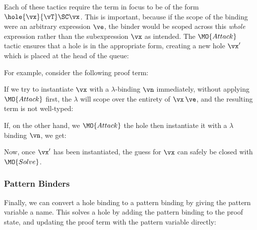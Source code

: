 Each of these tactics require the term in focus to be of the form $\hole{\vx}{\vT}\SC\vx$.
This is important, because if the scope of the binding were an arbitrary expression $\ve$,
the binder would be scoped across this \emph{whole} expression rather than the subexpression
$\vx$ as intended.
The $\MO{Attack}$ tactic ensures that a hole
is in the appropriate form, creating a new hole $\vx'$ which is placed at the
head of the queue:


\noindent
For example, consider the following proof term:

\DM{
\hole{\vx}{\va\to\vb}\SC\vx\:\ve
}

\noindent
If we try to instantiate $\vx$ with a $\lambda$-binding $\vn$ immediately,
without applying $\MO{Attack}$ first, the $\lambda$ will scope over the
entirety of $\vx\:\ve$, and the resulting term is not well-typed:

\DM{
\AR{
\lam{\vn}{\va}\SC\hole{\vx}{\vb}\SC\vx\:\ve
}
}

\noindent
If, on the other hand, we $\MO{Attack}$ the hole then instantiate it with
a $\lambda$ binding $\vn$, we get:


\noindent
Now, once $\vx'$ has been instantiated, the guess for $\vx$ can safely be
closed with $\MO{Solve}$.

\subsubsection{Pattern Binders}

Finally, we can convert a hole binding to a pattern binding by giving the 
pattern variable a name. This solves a hole
by adding the pattern binding to the proof state, and updating the proof term
with the pattern variable directly:


